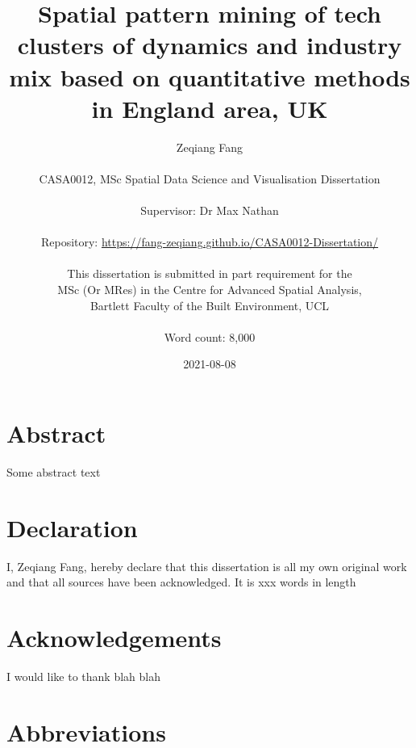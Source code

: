 \documentclass[
  12pt,
  oneside]{book}
\title{Spatial pattern mining of tech clusters of dynamics and industry mix based on quantitative methods in England area, UK}
\author{Zeqiang Fang\\
~\\
CASA0012, MSc Spatial Data Science and Visualisation Dissertation\\
~\\
Supervisor: Dr Max Nathan\\
~\\
Repository: \url{https://fang-zeqiang.github.io/CASA0012-Dissertation/}\\
~\\
This dissertation is submitted in part requirement for the\\
MSc (Or MRes) in the Centre for Advanced Spatial Analysis,\\
Bartlett Faculty of the Built Environment, UCL\\
~\\
Word count: 8,000}
\date{2021-08-08}
\begin{document}
\maketitle


\hypertarget{abstract}{%
\chapter*{Abstract}\label{abstract}}

Some abstract text


\hypertarget{declaration}{%
\chapter*{Declaration}\label{declaration}}

I, Zeqiang Fang, hereby declare that this dissertation is all my own original work and that all sources have been acknowledged. It is xxx words in length

\hypertarget{acknowledgements}{%
\chapter*{Acknowledgements}\label{acknowledgements}}

I would like to thank blah blah

\setcounter{tocdepth}{3}
\tableofcontents
\listoffigures
\listoftables

\hypertarget{abbreviations}{%
\chapter*{Abbreviations}\label{abbreviations}}
\end{document}
